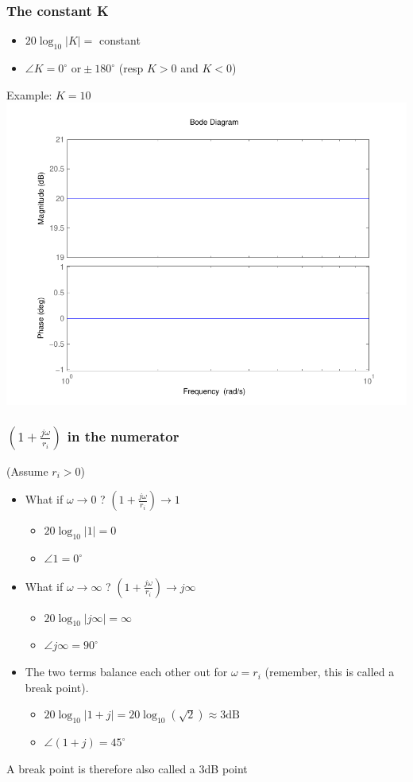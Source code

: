 \begin{frame}
\frametitle{The constant K}
\begin{itemize}
\item $20\log_{10}|K| =$ constant
\item $\angle K = 0^{\circ} \text{ or} \pm 180^{\circ}$  (resp $K > 0$ and $K < 0$)
\end{itemize}
Example: $K = 10$
\includegraphics[scale=0.5]{BodeConstant}

\end{frame}



\begin{frame}
\frametitle{$(1+\frac{j\omega}{r_i})$ in the numerator}
(Assume $r_i > 0$)
\begin{itemize}
\item What if $\omega \rightarrow 0$ ? \quad $(1+\frac{j\omega}{r_i}) \rightarrow 1$
\begin{itemize}
\item $20\log_{10}|1| = 0$
\item $\angle 1 = 0^{\circ}$
\end{itemize}

\item What if $\omega \rightarrow \infty$ ?  \quad  $(1+\frac{j\omega}{r_i}) \rightarrow j\infty$
\begin{itemize}
\item $20\log_{10}|j\infty| = \infty$
\item $\angle j\infty = 90^{\circ}$
\end{itemize}

\item The two terms balance each other out for $\omega = r_i$ (remember, this is called a break point).
\begin{itemize}
\item $20\log_{10}|1+j| = 20\log_{10}(\sqrt 2) \approx 3 \text{dB}$
\item $\angle(1+j) = 45^{\circ}$
\end{itemize}
\end{itemize}
A break point is therefore also called a 3dB point
\end{frame}



